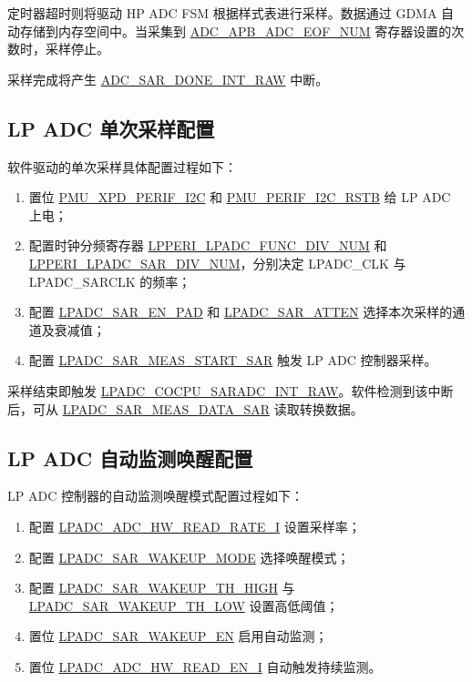 \documentclass[main\_\_CN.tex]{subfiles}
\begin{document}
定时器超时则将驱动 HP ADC FSM 根据样式表进行采样。数据通过 GDMA 自动存储到内存空间中。当采集到 \hyperref[fielddesc:ADCAPBADCEOFNUM]{ADC\_APB\_ADC\_EOF\_NUM} 寄存器设置的次数时，采样停止。

采样完成将产生 \hyperref[fielddesc:ADCSAR1DONEINTRAW]{ADC\_SAR\_DONE\_INT\_RAW} 中断。

\subsection{LP ADC 单次采样配置}

软件驱动的单次采样具体配置过程如下：
\begin{enumerate}
  \item 置位 \hyperref[fielddesc:PMUXPDPERIFI2C]{PMU\_XPD\_PERIF\_I2C} 和 \hyperref[fielddesc:PMUPERIFI2CRSTB]{PMU\_PERIF\_I2C\_RSTB} 给 LP ADC 上电；
  \item 配置时钟分频寄存器 \hyperref[fielddesc:LPPERILPADCFUNCDIVNUM]{LPPERI\_LPADC\_FUNC\_DIV\_NUM} 和 \hyperref[fielddesc:LPPERILPADCSAR1DIVNUM]{LPPERI\_LPADC\_SAR\_DIV\_NUM}，分别决定 LPADC\_CLK 与 LPADC\_SARCLK 的频率；
  \item 配置 \hyperref[fielddesc:LPADCSAR1ENPAD]{LPADC\_SAR\_EN\_PAD} 和 \hyperref[fielddesc:LPADCSAR1ATTEN]{LPADC\_SAR\_ATTEN} 选择本次采样的通道及衰减值；
  \item 配置 \hyperref[fielddesc:LPADCMEAS1STARTSAR]{LPADC\_SAR\_MEAS\_START\_SAR} 触发 LP ADC 控制器采样。
\end{enumerate}

采样结束即触发 \hyperref[fielddesc:LPADCCOCPUSARADC1INTRAW]{LPADC\_COCPU\_SARADC\_INT\_RAW}。软件检测到该中断后，可从 \hyperref[fielddesc:LPADCMEAS1DATASAR]{LPADC\_SAR\_MEAS\_DATA\_SAR} 读取转换数据。

\subsection{LP ADC 自动监测唤醒配置}

LP ADC 控制器的自动监测唤醒模式配置过程如下：
\begin{enumerate}
        \item 配置 \hyperref[fielddesc:LPADCADC1HWREADRATEI]{LPADC\_ADC\_HW\_READ\_RATE\_I} 设置采样率；
        \item 配置 \hyperref[fielddesc:LPADCSAR1WAKEUPMODE]{LPADC\_SAR\_WAKEUP\_MODE} 选择唤醒模式；
        \item 配置 \hyperref[fielddesc:LPADCSAR1WAKEUPTHHIGH]{LPADC\_SAR\_WAKEUP\_TH\_HIGH} 与 \hyperref[fielddesc:LPADCSAR1WAKEUPTHLOW]{LPADC\_SAR\_WAKEUP\_TH\_LOW} 设置高低阈值；
        \item 置位 \hyperref[fielddesc:LPADCSAR1WAKEUPEN]{LPADC\_SAR\_WAKEUP\_EN} 启用自动监测；
        \item 置位 \hyperref[fielddesc:LPADCADC1HWREADENI]{LPADC\_ADC\_HW\_READ\_EN\_I} 自动触发持续监测。
    \end{enumerate}
\end{document}
